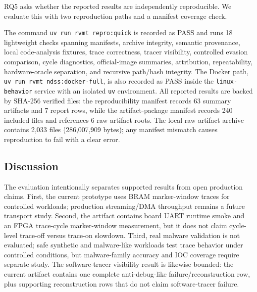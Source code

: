 RQ5 asks whether the reported results are independently reproducible. We
evaluate this with two reproduction paths and a manifest coverage check.

The command \texttt{uv run rvmt repro:quick} is recorded as PASS and runs 18
lightweight checks spanning manifests, archive integrity, semantic provenance,
local code-analysis fixtures, trace correctness, tracer visibility, controlled
evasion comparison, cycle diagnostics, official-image summaries, attribution,
repeatability, hardware-oracle separation, and recursive path/hash integrity.
The Docker path, \texttt{uv run rvmt ndss:docker-full}, is also recorded as PASS
inside the \texttt{linux-behavior} service with an isolated \texttt{uv}
environment. All reported results are backed by SHA-256 verified files: the
reproducibility manifest records 63 summary artifacts and 7 report rows, while
the artifact-package manifest records 240 included files and references 6 raw
artifact roots. The local raw-artifact archive contains 2,033 files
(286,007,909 bytes); any manifest mismatch causes reproduction to fail with a
clear error.

\subsection{Discussion}
\label{subsec:discussion}

The evaluation intentionally separates supported results from open production
claims. First, the current prototype uses BRAM marker-window traces for
controlled workloads; production streaming/DMA throughput remains a future
transport study. Second, the artifact contains board UART runtime smoke and an
FPGA trace-cycle marker-window measurement, but it does not claim cycle-level
trace-off versus trace-on slowdown. Third, real malware validation is not
evaluated; safe synthetic and malware-like workloads test trace behavior under
controlled conditions, but malware-family accuracy and IOC coverage require
separate study. The software-tracer visibility result is likewise bounded: the
current artifact contains one complete anti-debug-like failure/reconstruction
row, plus supporting reconstruction rows that do not claim software-tracer
failure.
